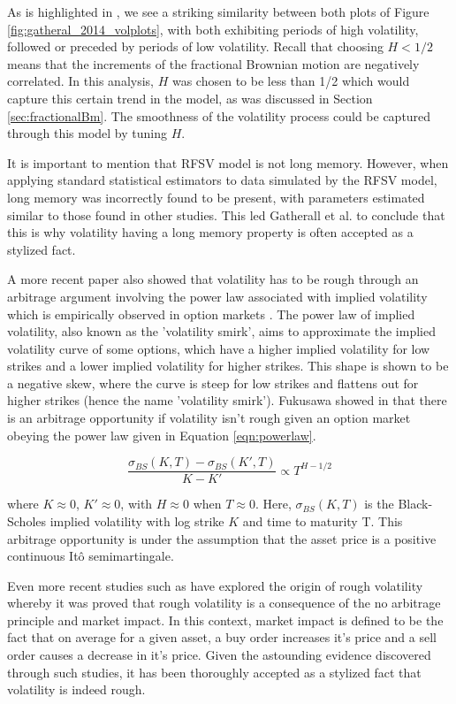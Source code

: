 \documentclass[12pt,oneside]{article}
\begin{document}
As is highlighted in \cite{gatheral2014volatility}, we see a striking similarity between both plots of Figure \ref{fig:gatheral_2014_volplots}, with both exhibiting periods of high volatility, followed or preceded by periods of low volatility.  Recall that choosing $H<1/2$ means that the increments of the fractional Brownian motion are negatively correlated. In this analysis, $H$ was chosen to be less than 1/2 which would capture this certain trend in the model, as was discussed in Section \ref{sec:fractionalBm}. The smoothness of the volatility process could be captured through this model by tuning $H$.

It is important to mention that RFSV model is not long memory. However, when applying standard statistical estimators to data simulated by the RFSV model, long memory was incorrectly found to be present, with parameters estimated similar to those found in other studies. This led Gatherall et al. to conclude that this is why volatility having a long memory property is often accepted as a stylized fact. 

A more recent paper \cite{fukasawa2020volatility} also showed that volatility has to be rough through an arbitrage argument involving the power law associated with implied volatility which is empirically observed in option markets \cite{Carr2001}. The power law of implied volatility, also known as the 'volatility smirk', aims to approximate the implied volatility curve of some options, which have a higher implied volatility for low strikes and a lower implied volatility for higher strikes. This shape is shown to be a negative skew, where the curve is steep for low strikes and flattens out for higher strikes (hence the name 'volatility smirk'). Fukusawa showed in \cite{fukasawa2020volatility} that there is an arbitrage opportunity if volatility isn't rough given an option market obeying the power law given in Equation \ref{eqn:powerlaw}.

\begin{equation}
\label{eqn:powerlaw}
\frac{\sigma_{BS}(K,T) - \sigma_{BS}(K',T)}{K-K'}\propto T^{H-1/2}
\end{equation}

where $K \approx 0$, $K' \approx 0$, with $H \approx 0$ when $T \approx 0$. Here, $\sigma_{BS}(K,T)$ is the Black-Scholes implied volatility with log strike $K$ and time to maturity T. This arbitrage opportunity is under the assumption that the asset price is a positive continuous It\^o semimartingale. 

Even more recent studies such as \cite{jusselin2018noarbitrage} have explored the origin of rough volatility whereby it was proved that rough volatility is a consequence of the no arbitrage principle and market impact. In this context, market impact is defined to be the fact that on average for a given asset, a buy order increases it's price and a sell order causes a decrease in it's price. Given the astounding evidence discovered through such studies, it has been thoroughly accepted as a stylized fact that volatility is indeed rough. 
\end{document}
